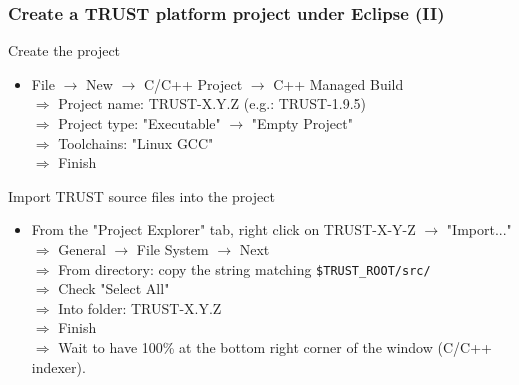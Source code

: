 \documentclass[10pt, hyperref={unicode=true,pdfusetitle, bookmarks=true,bookmarksnumbered=false,bookmarksopen=false, breaklinks=false,pdfborder={0 0 1},backref=true,colorlinks=true,linkcolor=darkblue,pageanchor, urlcolor=darkblue}]{beamer}
\begin{document}
\begin{frame}
\frametitle{Create a TRUST platform project under Eclipse (II)}

\begin{exampleblock}{Create the project}
\begin{itemize}
\item File $\rightarrow$ New $\rightarrow$ C/C++ Project $\rightarrow$ C++ Managed Build \\
 $\Rightarrow$ Project name: TRUST-X.Y.Z (e.g.: TRUST-1.9.5) \\
 $\Rightarrow$ Project type: "Executable"  $\rightarrow$  "Empty Project" \\
 $\Rightarrow$ Toolchains: "Linux GCC" \\
 $\Rightarrow$ Finish
\end{itemize}
\end{exampleblock}

\begin{exampleblock}{Import TRUST source files into the project}
\begin{itemize}
\item From the "Project Explorer" tab, right click on TRUST-X-Y-Z  $\rightarrow$  "Import..." \\
  $\Rightarrow$ General  $\rightarrow$ File System $\rightarrow$ Next \\
  $\Rightarrow$ From directory: copy the string matching \texttt{\$TRUST\_ROOT/src/} \\
  $\Rightarrow$ Check "Select All" \\
  $\Rightarrow$ Into folder: TRUST-X.Y.Z \\
  $\Rightarrow$ Finish \\
  $\Rightarrow$ Wait to have 100\% at the bottom right corner of the window  (C/C++ indexer).
\end{itemize}
\end{exampleblock}

\end{frame}
\end{document}
